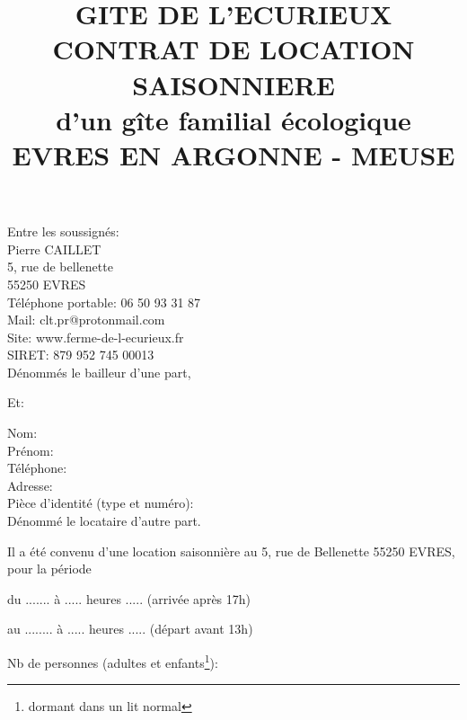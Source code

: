 \documentclass[a4paper,11pt]{article}
\title{GITE DE L'ECURIEUX\\CONTRAT DE LOCATION SAISONNIERE\\d’un gîte familial écologique\\EVRES EN ARGONNE - MEUSE}
\begin{document}
\date{}
\maketitle

\center Entre les soussignés:\\
\flushleft 
Pierre CAILLET\\
5, rue de bellenette\\
55250 EVRES\\                                                                                         
Téléphone portable: 06 50 93 31 87 \\
Mail: clt.pr@protonmail.com\\
Site: www.ferme-de-l-ecurieux.fr\\
SIRET: 879 952 745 00013\\

\vspace{0.5cm}
Dénommés le bailleur d’une part,                            

\center Et:

\flushleft
Nom: \\
Prénom:\\
Téléphone:\\
Adresse:\\
Pièce d'identité (type et numéro):\\

\vspace{0.5cm}
Dénommé le locataire d'autre part.



\flushleft
Il a été convenu d'une location saisonnière au 5, rue de Bellenette 55250 EVRES, pour la période
\vspace{0.5cm}

du   .......   à .....    heures .....    (arrivée après 17h)
\vspace{0.5cm}

au   ........   à .....    heures .....   (départ avant 13h)
\vspace{0.5cm}

Nb de personnes (adultes et enfants\footnote{dormant dans un lit normal}): 
\vspace{0.5cm}

\newpage{}




\vspace{0.5cm}
\end{document}
